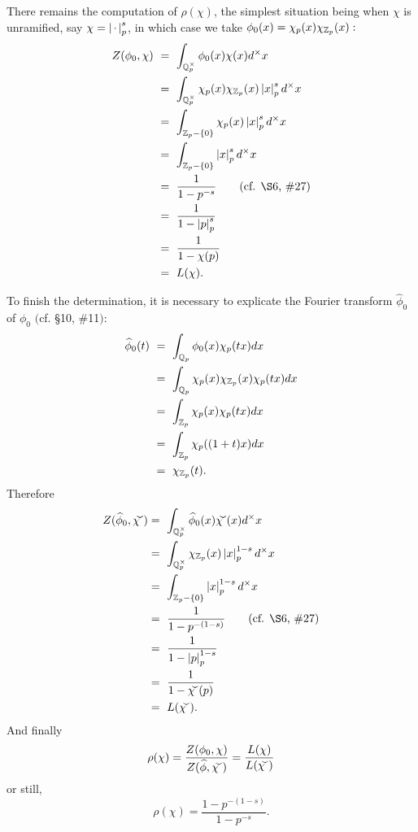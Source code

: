 \vspace{0.1cm}

There remains the computation of $\rho(\chi)$, the simplest situation being when $\chi$ is unramified, say 
$\chi = \left\vert\hspace{0.05cm} \cdot \hspace{0.05cm}\right\vert_p^s$, in which case we take $\phi_0(x) = \chi_p(x) \chi_{\mathbb{Z}_p}(x):$
\begin{align*}
Z(\phi_0,\chi)	\ 
&=\  \int_{\Q_p^\times} \phi_0(x) \chi(x) d^\times x\\	
&=\  \int_{\Q_p^\times}  \chi_p(x) \chi_{\Z_p}(x) \abs{x}_p^s d^\times x\\		
&=\  \int_{\Z_p - \{0\}} \chi_p(x) \abs{x}_p^s d^\times x\\	
&=\  \int_{\Z_p - \{0\}} \abs{x}_p^s d^\times x\\
&=\  \frac{1}{1 - p^{-s}} \qquad \text{(cf. \S6, \#27)}\\
&=\  \frac{1}{1 - \abs{p}_p^s} \\
&=\  \frac{1}{1 - \chi(p)}\\
&=\  L(\chi).
\end{align*}

To finish the determination, it is necessary to explicate the Fourier transform 
$\widehat{\phi}_0$ of $\phi_0$ $($cf. \S10, \#11$):$
\begin{align*}
\widehat{\phi}_0(t)\ 
&=\  \int_{\Q_p} \phi_0(x) \chi_p(tx) dx\\	
&=\  \int_{\Q_p} \chi_p(x) \chi_{\Z_p}(x) \chi_p(tx) dx\\	
&=\  \int_{\Z_p} \chi_p(x)  \chi_p(tx) dx\\	
&=\  \int_{\Z_p} \chi_p((1+t)x) dx\\
&=\  \chi_{\Z_p}(t).
\end{align*}
Therefore
\begin{align*}
Z(\widehat{\phi}_0, \widecheck{\chi})	
&=\  \int_{\Q_p^\times} \widehat{\phi}_0(x)  \widecheck{\chi}(x) d^\times x\\	
&=\  \int_{\Q_p^\times} \chi_{\Z_p}(x) \abs{x}_p^{1-s} d^\times x\\	
&=\  \int_{\Z_p-\{0\}} \abs{x}_p^{1-s} d^\times x\\	
&=\  \frac{1}{1 - p^{-(1-s)}}	\qquad \text{(cf. \S6, \#27)}\\
&=\  \frac{1}{1 - \abs{p}_p^{1-s}}\\
&=\  \frac{1}{1 - \widecheck{\chi}(p)}\\
&=\  L(\widecheck{\chi}).
\end{align*}
And finally
\[
\rho(\chi) = \frac{Z(\phi_0, \chi)}{Z(\widehat{\phi}, \widecheck{\chi})	} = \frac{L(\chi)}{L(\widecheck{\chi})}
\]
or still, 
\[
\rho(\chi) = \frac{1 - p^{-(1-s)}}{1 - p^{-s}}.
\]

